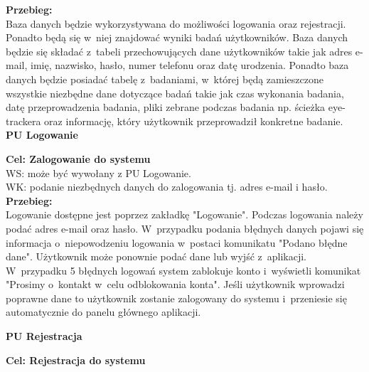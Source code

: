 \documentclass[12pt, letterpaper]{article}
\begin{document}
		\textbf{Przebieg: }\\
		Baza danych będzie wykorzystywana do możliwości logowania oraz rejestracji. Ponadto będą się w~niej znajdować wyniki badań użytkowników. Baza danych będzie się składać z~tabeli przechowujących dane użytkowników takie jak adres e-mail, imię, nazwisko, hasło, numer telefonu oraz datę urodzenia. Ponadto baza danych będzie posiadać tabelę z~badaniami, w~której będą zamieszczone wszystkie niezbędne dane dotyczące badań takie jak czas wykonania badania, datę przeprowadzenia badania, pliki zebrane podczas badania np. ścieżka eye-trackera oraz informację, który użytkownik przeprowadził konkretne badanie.
		 \\
		
		
		
		\textbf{PU Logowanie}
		
		\quad
		
		\textbf{Cel: Zalogowanie do systemu}\\
		
		WS: może być wywołany z PU Logowanie.\\
		
		WK: podanie niezbędnych danych do zalogowania tj. adres e-mail i hasło.\\
		
		\textbf{Przebieg:}\\
		Logowanie dostępne jest poprzez zakładkę "Logowanie". Podczas logowania należy podać adres e-mail oraz hasło. W~przypadku podania błędnych danych pojawi się informacja o~niepowodzeniu logowania w~postaci komunikatu "Podano błędne dane". Użytkownik może ponownie podać dane lub wyjść z~aplikacji. W~przypadku 5 błędnych logowań system zablokuje konto i~wyświetli komunikat "Prosimy o~kontakt w~celu odblokowania konta". Jeśli użytkownik wprowadzi poprawne dane to użytkownik zostanie zalogowany do systemu i~przeniesie się automatycznie do panelu głównego aplikacji.\\
		
		
		\newpage		
		
		\textbf{PU Rejestracja}
		
		\quad
		
		\textbf{Cel: Rejestracja do systemu}\\
		
\end{document}
